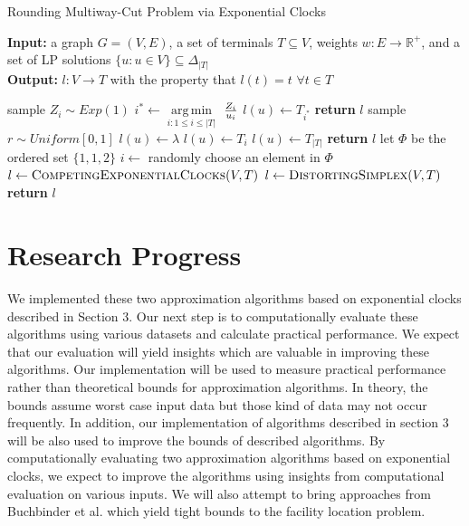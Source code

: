 \documentclass[a4paper]{article}
\DeclareMathOperator*{\argmin}{arg\,min}
\begin{document}
\begin{algorithm}
\caption{Rounding Multiway-Cut Problem via Exponential Clocks}
\hspace*{\algorithmicindent} \textbf{Input:} a graph $G=(V,E)$, a set of terminals $T\subseteq V$, weights $\textit{w}: E\rightarrow \mathbb{R}^{+}$, and a set of LP solutions $\{u:u\in V\}\subseteq \Delta_{|T|}$\\ 
\hspace*{\algorithmicindent} \textbf{Output:} $l:V\rightarrow T$ with the property that $l(t)=t$ $\forall t\in T$
\begin{algorithmic}[1]
\State sample $Z_{i}\sim Exp(1)$
\EndFor
{}
\State $i^{*}\gets \argmin\limits_{i:1\le i\le |T|}$ $Z_{i}\over u_{i}$
\State $l(u)\gets T_{i^{*}}$
\EndFor
\State \textbf{return} $l$
\EndFunction
{}
\State sample $r\sim Uniform[0,1]$
\State $l(u)\gets \lambda$
\State $l(u)\gets T_{i}$
\EndIf
\EndFor
\EndFor
{}
\State $l(u)\gets T_{|T|}$
\EndIf
\EndFor
\State \textbf{return} $l$
\EndFunction
\State let $\Phi$ be the ordered set $\{1,1,2\}$
\State $i\gets $ randomly choose an element in $\Phi$
\State $l\gets \textsc{CompetingExponentialClocks}(V,T)$
\Else
\State $l\gets \textsc{DistortingSimplex}(V,T)$
\EndIf
\State \textbf{return} $l$
\end{algorithmic}
\end{algorithm}



\section{Research Progress}
We implemented these two approximation algorithms based on exponential clocks described in Section 3. Our next step is to computationally evaluate these algorithms using various datasets and calculate practical performance. We expect that our evaluation will yield insights which are valuable in improving these algorithms. 
\newline
\indent
Our implementation will be used to measure practical performance rather than theoretical bounds for approximation algorithms. In theory, the bounds assume worst case input data but those kind of data may not occur frequently.
\newline
\indent
In addition, our implementation of algorithms described in section 3 will be also used to improve the bounds of described algorithms. By computationally evaluating two approximation algorithms based on exponential clocks, we expect to improve the algorithms using insights from computational evaluation on various inputs. We will also attempt to bring approaches from Buchbinder et al.\cite{buchbinder2013simplex} which yield tight bounds to the facility location problem.
\end{document}

